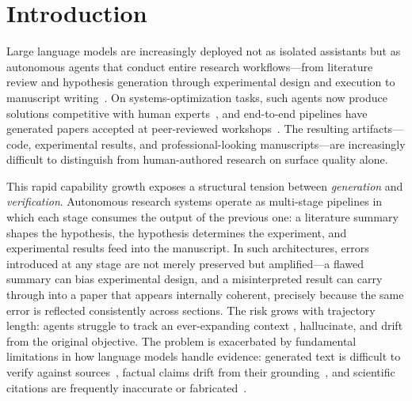 \section{Introduction}
\label{sec:intro}


Large language models are increasingly deployed not as isolated assistants but as autonomous agents that conduct entire research workflows---from literature review and hypothesis generation through experimental design and execution to manuscript writing~\citep{lu2024aiscientist, yamada2025aiscientistv2, huang2025deepscientist, tang2025airesearcher, schmidgall2025agentlab, jansen2025codescientist}.
On systems-optimization tasks, such agents now produce solutions competitive with human experts~\citep{cheng2025barbarians, novikov2025alphaevolve}, and end-to-end pipelines have generated papers accepted at peer-reviewed workshops~\citep{yamada2025aiscientistv2}.
The resulting artifacts---code, experimental results, and professional-looking manuscripts---are increasingly difficult to distinguish from human-authored research on surface quality alone.


This rapid capability growth exposes a structural tension between \emph{generation} and \emph{verification}.
Autonomous research systems operate as multi-stage pipelines in which each stage consumes the output of the previous one: a literature summary shapes the hypothesis, the hypothesis determines the experiment, and experimental results feed into the manuscript.
In such architectures, errors introduced at any stage are not merely preserved but amplified---a flawed summary can bias experimental design, and a misinterpreted result can carry through into a paper that appears internally coherent, precisely because the same error is reflected consistently across sections.
The risk grows with trajectory length: agents struggle to track an ever-expanding context \citep{liu2024lost,liu2023agentbench}, hallucinate, and drift from the original objective.
The problem is exacerbated by fundamental limitations in how language models handle evidence: generated text is difficult to verify against sources~\citep{liu2023evaluating}, factual claims drift from their grounding~\citep{min2023factscore}, and scientific citations are frequently inaccurate or fabricated~\citep{press2024citeme}.

